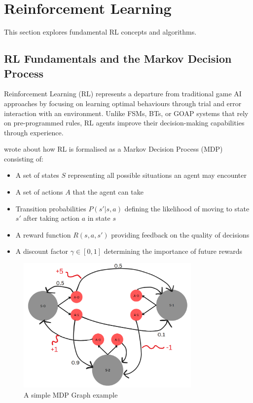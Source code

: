 \section{Reinforcement Learning}

This section explores fundamental RL concepts and algorithms.

\subsection{RL Fundamentals and the Markov Decision Process}

Reinforcement Learning (RL) represents a departure from traditional game AI approaches by focusing on learning optimal behaviours through trial and error interaction with an environment. \cite{shao2019surveydeepreinforcementlearning} 
Unlike FSMs, BTs, or GOAP systems that rely on pre-programmed rules, RL agents improve their decision-making capabilities through experience.

\cite{cornell_mdp} wrote about how RL is formalised as a Markov Decision Process (MDP) consisting of:
\begin{itemize}
    \item A set of states $S$ representing all possible situations an agent may encounter
    \item A set of actions $A$ that the agent can take
    \item Transition probabilities $P(s'|s,a)$ defining the likelihood of moving to state $s'$ after taking action $a$ in state $s$
    \item A reward function $R(s,a,s')$ providing feedback on the quality of decisions
    \item A discount factor $\gamma \in [0,1]$ determining the importance of future rewards
\end{itemize}

\begin{figure}[H]
    \centering
    \includegraphics[width=0.8\textwidth]{figures/mdp_framework.png}
    \caption{A simple MDP Graph example}
    \label{fig:mdp-framework}
\end{figure}

